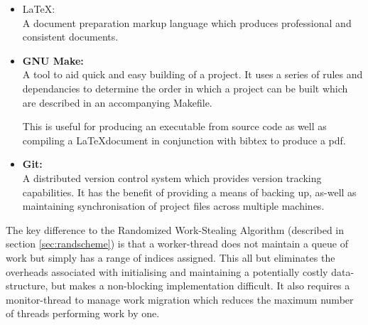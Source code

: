 \begin{itemize}
\item \LaTeX: \\   
            A document preparation markup language which produces professional and consistent 
            documents. 

\item \textbf{GNU Make:} \\ 
            A tool to aid quick and easy building of a project. It uses a series of 
            rules and dependancies to determine the order in which a project can be built 
            which are described in an accompanying Makefile. 
                         
            This is useful for  producing an executable from source code as well
            as compiling a \LaTeX  document in conjunction with bibtex to produce a pdf.

\item \textbf{Git:} \\     
            A distributed version control system which provides version tracking capabilities. 
            It has the benefit of providing a means of backing up, as-well as maintaining 
            synchronisation of project files across multiple machines.
\end{itemize}

The key difference to the Randomized Work-Stealing Algorithm (described in section \ref{sec:randscheme}) is that a \gls{worker-thread} 
does not maintain a queue of work but simply has a range of indices assigned. This all but eliminates the overheads associated with initialising and 
maintaining a potentially costly data-structure, but makes a \gls{non-blocking} implementation difficult. It also requires a monitor-thread to manage
work migration which reduces the maximum number of threads performing work by one.


